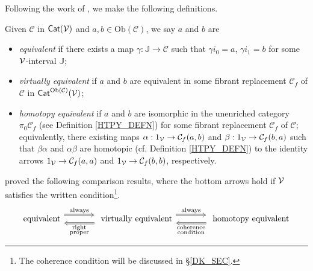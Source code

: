 \documentclass[a4paper,10pt
,draft
]{article}%
\newcommand{\J}{\mathbb J}
\renewcommand{\1}{\eta}%
\begin{document}
Following the work of \cite{Cav, BM13}, we make the following definitions.

\begin{definition}
      \label{EQUIV_DEF}
      Given $\mathcal{C}$ in  $\mathsf{Cat}(\mathcal V)$ and $a,b\in\mathrm{Ob}(\mathcal C)$, we say $a$ and $b$ are
      \begin{itemize}
      \item {\em equivalent} if there exists a map $\gamma: \J \to \mathcal C$ such that
            $\gamma i_0 = a$, $\gamma i_1 = b$
            for some $\mathcal V$-interval $\J$;
      \item {\em virtually equivalent} if $a$ and $b$ are equivalent in some fibrant replacement
            $\mathcal C_f$ of $\mathcal C$ in $\mathsf{Cat}^{\mathrm{Ob}(\mathcal C)}(\mathcal V)$;
      \item {\em homotopy equivalent} if $a$ and $b$ are isomorphic in the unenriched category $\pi_0 \mathcal C_f$ (see Definition \ref{HTPY_DEFN})
            for some fibrant replacement $\mathcal C_f$ of $\mathcal C$;
            equivalently,
            there existing maps
            $\alpha: 1_{\mathcal V} \to \mathcal C_f(a,b)$ and $\beta: 1_{\mathcal V}\to \mathcal C_f(b,a)$ such that
            $\beta\alpha$ and $\alpha\beta$ are homotopic (cf. Definition \ref{HTPY_DEFN})
            to the identity arrows
            $1_{\mathcal V} \to \mathcal C_f(a,a)$ and $1_{\mathcal V} \to \mathcal C_f(b,b)$, respectively.
      \end{itemize}
\end{definition}

\cite{Cav, BM13} proved the following comparison results,
where the bottom arrows hold if $\mathcal V$ satisfies the written condition\footnote{The coherence condition will be discussed in \S \ref{DK_SEC}.}.
\[
      \begin{tikzcd}[column sep = large]
            \mbox{equivalent}
            \arrow[r, Rightarrow, shift left=2, "\mathrm{always}"]
            &
            \mbox{ virtually equivalent}
            \arrow[r, Rightarrow, shift left=2, "\mathrm{always}"]
            \arrow[l, Rightarrow, shift left = 2, "\substack{\mathrm{right} \\ \mathrm{proper}}"]
            &
            \mbox{ homotopy equivalent}
            \arrow[l, Rightarrow, shift left = 2, "\substack{\mathrm{coherence} \\ \mathrm{condition}}"]
      \end{tikzcd}
\]
\end{document}
